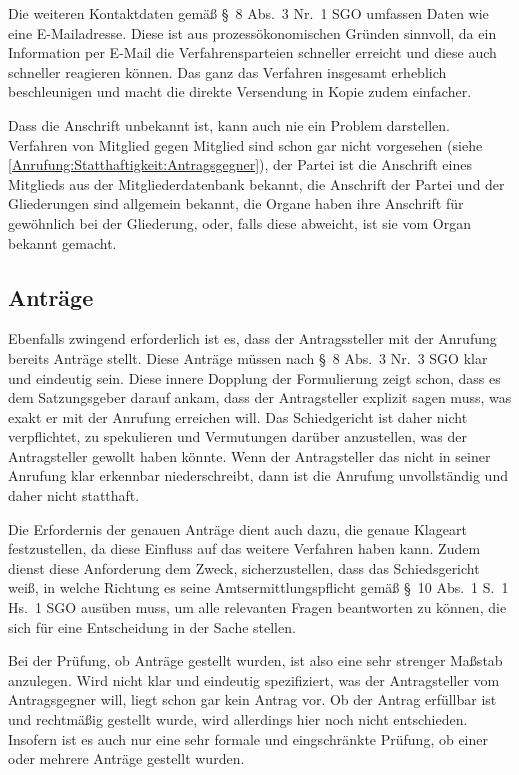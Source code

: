 Die weiteren Kontaktdaten gemäß \S~8 Abs.~3 Nr.~1 SGO umfassen Daten wie eine E-Mailadresse. Diese ist aus prozessökonomischen Gründen sinnvoll, da ein Information per E-Mail die Verfahrensparteien schneller erreicht und diese auch schneller reagieren können. Das ganz das Verfahren insgesamt erheblich beschleunigen und macht die direkte Versendung in Kopie zudem einfacher.

Dass die Anschrift unbekannt ist, kann auch nie ein Problem darstellen. Verfahren von Mitglied gegen Mitglied sind schon gar nicht vorgesehen (siehe \ref{Anrufung:Statthaftigkeit:Antragsgegner}), der Partei ist die Anschrift eines Mitglieds aus der Mitgliederdatenbank bekannt, die Anschrift der Partei und der Gliederungen sind allgemein bekannt, die Organe haben ihre Anschrift für gewöhnlich bei der Gliederung, oder, falls diese abweicht, ist sie vom Organ bekannt gemacht.

\subsection{Anträge}
\label{Anrufung:Statthaftigkeit:Antraege}
Ebenfalls zwingend erforderlich ist es, dass der Antragssteller mit der Anrufung bereits Anträge stellt.
Diese Anträge müssen nach \S~8 Abs.~3 Nr.~3 SGO klar und eindeutig sein.
Diese innere Dopplung der Formulierung zeigt schon, dass es dem Satzungsgeber darauf ankam, dass der Antragsteller explizit sagen muss, was exakt er mit der Anrufung erreichen will.
Das Schiedgericht ist daher nicht verpflichtet, zu spekulieren und Vermutungen darüber anzustellen, was der Antragsteller gewollt haben könnte. 
Wenn der Antragsteller das nicht in seiner Anrufung klar erkennbar niederschreibt, dann ist die Anrufung unvollständig und daher nicht statthaft.

Die Erfordernis der genauen Anträge dient auch dazu, die genaue Klageart festzustellen, da diese Einfluss auf das weitere Verfahren haben kann.
Zudem dienst diese Anforderung dem Zweck, sicherzustellen, dass das Schiedsgericht weiß, in welche Richtung es seine Amtsermittlungspflicht gemäß \S~10 Abs.~1 S.~1 Hs.~1 SGO ausüben muss, um alle relevanten Fragen beantworten zu können, die sich für eine Entscheidung in der Sache stellen.

Bei der Prüfung, ob Anträge gestellt wurden, ist also eine sehr strenger Maßstab anzulegen. Wird nicht klar und eindeutig spezifiziert, was der Antragsteller vom Antragsgegner will, liegt schon gar kein Antrag vor.
Ob der Antrag erfüllbar ist und rechtmäßig gestellt wurde, wird allerdings hier noch nicht entschieden.
Insofern ist es auch nur eine sehr formale und eingschränkte Prüfung, ob einer oder mehrere Anträge gestellt wurden.

